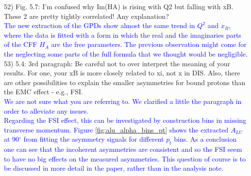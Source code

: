52) Fig. 5.7: I'm confused why Im(HA) is rising with Q2 but falling with xB.  
These 2 are pretty tightly correlated! Any explanation?\\
\textcolor{blue}{The new extraction of the GPDs show almost the same trend in 
   $Q^2$ and $x_B$, where the data is fitted with a form in which the real and 
   the imaginaries parts of the CFF $H_A$ are the free parameters. The previous 
   observation might come for the neglecting some parts of the full formula 
that we thought would be negligible. } \\

53) 5.4: 3rd paragraph: Be careful not to over interpret the meaning of your 
results. For one, your xB is more closely related to xi, not x in DIS. Also, 
there are other possibilities to explain the smaller asymmetries for bound 
protons than the EMC effect - e.g., FSI. \\
\textcolor{blue}{We are not sure what you are referring to. We clarified a 
little the paragraph in order to alleviate any issues.} \\
\textcolor{blue}{Regarding the FSI effect, this can be investigated by 
construction bins in missing transverse momentum. Figure 
\ref{fig:alu_alpha_bins_pt} shows the extracted $A_{LU}$ at 90$^{\circ}$ from 
fitting the asymmetry signals for different $p_t$ bins. As a conclusion one 
can see that the incoherent asymmetries are consistent and so the FSI seem to 
have no big effects on the measured asymmetries. This question of course is to 
be discussed in more detail in the paper, rather than in the analysis note.}\\



